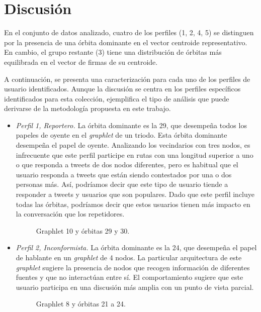 \section{Discusión}
En el conjunto de datos analizado, cuatro de los perfiles (1, 2, 4, 5) se distinguen por la presencia de una órbita dominante en el vector centroide representativo. En cambio, el grupo restante (3) tiene una distribución de órbitas más equilibrada en el vector de firmas de su centroide.

A continuación, se presenta una caracterización para cada uno de los perfiles de usuario identificados. Aunque la discusión se centra en los perfiles específicos identificados para esta colección, ejemplifica el tipo de análisis que puede derivarse de la metodología propuesta en este trabajo.   

\begin{itemize} 
    
\item \emph{Perfil 1, Reportero.} La órbita dominante es la 29, que desempeña todos los papeles de oyente en el \textit{graphlet} de un triodo. Esta órbita dominante desempeña el papel de oyente. Analizando los vecindarios con tres nodos, es infrecuente que este perfil participe en rutas con una longitud superior a uno o que responda a tweets de dos nodos diferentes, pero es habitual que el usuario responda a tweets que están siendo contestados por una o dos personas más. Así, podríamos decir que este tipo de usuario tiende a responder a tweets y usuarios que son populares. Dado que este perfil incluye todas las órbitas, podríamos decir que estos usuarios tienen más impacto en la conversación que los repetidores. \begin{figure}[htbp]
   \centering
   
    \caption{Graphlet 10 y órbitas 29 y 30.}
    \label{fig:G10}
\end{figure}

\item \emph{Perfil 2, Inconformista.} La órbita dominante es la 24, que desempeña el papel de hablante en un \textit{graphlet} de 4 nodos. La particular arquitectura de este \textit{graphlet} sugiere la presencia de nodos que recogen información de diferentes fuentes y que no interactúan entre sí. El comportamiento sugiere que este usuario participa en una discusión más amplia con un punto de vista parcial. \begin{figure}[htbp]
   \centering
   
    \caption{Graphlet 8 y órbitas 21 a 24.}
    \label{fig:G8}
\end{figure}


\end{itemize}
